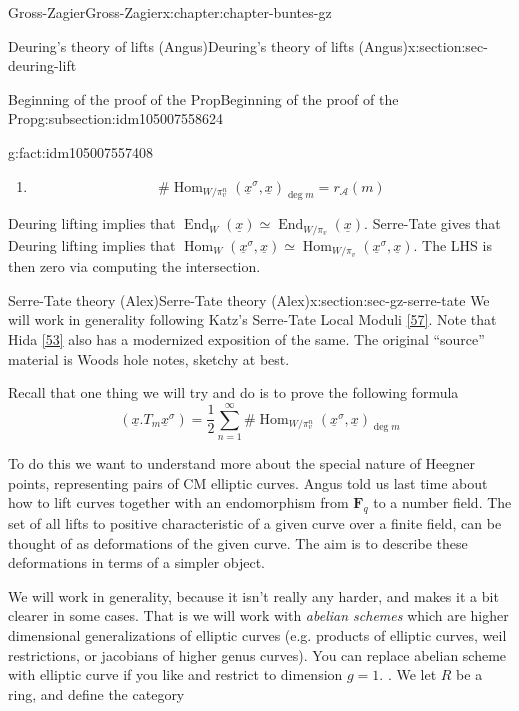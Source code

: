 \documentclass[oneside,10pt,]{book}
\numberwithin{equation}{section}
\newcommand{\FF}{\mathbf{F}}
\DeclareMathOperator{\End}{End}
\DeclareMathOperator{\Hom}{Hom}
\begin{document}
\begin{chapterptx}{Gross-Zagier}{}{Gross-Zagier}{}{}{x:chapter:chapter-buntes-gz}
\begin{sectionptx}{Deuring's theory of lifts (Angus)}{}{Deuring's theory of lifts (Angus)}{}{}{x:section:sec-deuring-lift}
\begin{subsectionptx}{Beginning of the proof of the Prop}{}{Beginning of the proof of the Prop}{}{}{g:subsection:idm105007558624}
\begin{fact}{}{}{g:fact:idm105007557408}
\begin{enumerate}
\begin{equation*}
\end{equation*}
(4.5) in Gross-Zagier%
\item{}%
\begin{equation*}
\# \Hom_{W/\pi _v^n}(\underline x^\sigma , \underline x)_{\deg m} = r_{\mathscr A}(m)
\end{equation*}
%
\end{enumerate}
%
\end{fact}
Deuring lifting implies that \(\End_W(\underline x) \simeq \End_{W/\pi _v}(\underline x)\). Serre-Tate gives that Deuring lifting implies that \(\Hom_W(\underline x^\sigma , \underline x) \simeq \Hom_{W/\pi _v}(\underline x^\sigma , \underline x)\). The LHS is then zero via computing the intersection.%
\end{subsectionptx}
\end{sectionptx}
%
%
\typeout{************************************************}
\typeout{************************************************}
%
\begin{sectionptx}{Serre-Tate theory (Alex)}{}{Serre-Tate theory (Alex)}{}{}{x:section:sec-gz-serre-tate}
We will work in generality following Katz's Serre-Tate Local Moduli \hyperlink{x:biblio:bib-katz-serre-tate}{[57]}. Note that Hida \hyperlink{x:biblio:bib-hida-geometric}{[53]} also has a modernized exposition of the same. The original ``source'' material is Woods hole notes, sketchy at best.%
\par
Recall that one thing we will try and do is to prove the following formula%
\begin{equation*}
(\underline x. T_m \underline x^\sigma ) = \frac12 \sum_{n=1}^\infty  \#\Hom_{W/\pi _v^n}(\underline x^\sigma , \underline x)_{\deg m}
\end{equation*}
%
\par
To do this we want to understand more about the special nature of Heegner points, representing pairs of CM elliptic curves. Angus told us last time about how to lift curves together with an endomorphism from \(\FF_q\) to a number field. The set of all lifts to positive characteristic of a given curve over a finite field, can be thought of as deformations of the given curve. The aim is to describe these deformations in terms of a simpler object.%
\par
We will work in generality, because it isn't really any harder, and makes it a bit clearer in some cases. That is we will work with \emph{abelian schemes} which are higher dimensional generalizations of elliptic curves (e.g. products of elliptic curves, weil restrictions, or jacobians of higher genus curves). You can replace abelian scheme with elliptic curve if you like and restrict to dimension \(g =1\). . We let \(R\) be a ring, and define the category%

\end{sectionptx}
\end{chapterptx}
\end{document}
